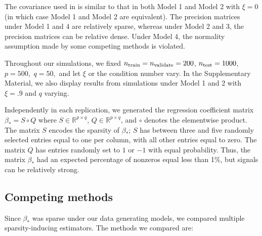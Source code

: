\documentclass[12pt]{article}
\begin{document}
The covariance used in \citet{liu2015calibrated} is similar to that in both Model 1 and Model 2 with $\xi = 0$ (in which case Model 1 and Model 2 are equivalent). The precision matrices under Model 1 and 4 are relatively sparse, whereas under Model 2 and 3, the precision matrices can be relative dense. Under Model 4, the normality assumption made by some competing methods is violated. 

Throughout our simulations, we fixed $n_{\rm train} = n_{\rm validate} = 200$, $n_{\rm test} = 1000$, $p = 500,$ $q=50,$ and let $\xi$ or the condition number vary. In the Supplementary Material, we also display results from simulations under Model 1 and 2 with $\xi = .9$ and $q$ varying. 

Independently in each replication, we generated the regression coefficient matrix $\beta_* = S \circ Q$ where $S \in \mathbb{R}^{p \times q}$, $Q \in \mathbb{R}^{p \times q}$, and $\circ$ denotes the elementwise product. The matrix $S$ encodes the sparsity of $\beta_*$; $S$ has between three and five randomly selected entries equal to one per column, with all other entries equal to zero. The matrix $Q$ has entries randomly set to $1$ or $-1$ with equal probability. Thus, the matrix $\beta_*$ had an expected percentage of nonzeros equal less than 1\%, but signals can be relatively strong.

\subsection{Competing methods}\label{subsec:comp_methods}
Since $\beta_*$ was sparse under our data generating models, we compared multiple sparsity-inducing estimators. The methods we compared are: 
\end{document}
